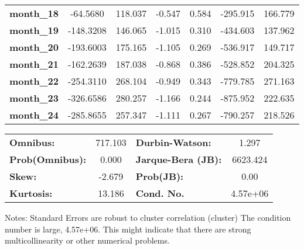 \begin{center}
\begin{tabular}{lcccccc}
\textbf{month\_18}    &     -64.5680  &      118.037     &    -0.547  &         0.584        &     -295.915    &      166.779     \\
\textbf{month\_19}    &    -148.3208  &      146.065     &    -1.015  &         0.310        &     -434.603    &      137.962     \\
\textbf{month\_20}    &    -193.6003  &      175.165     &    -1.105  &         0.269        &     -536.917    &      149.717     \\
\textbf{month\_21}    &    -162.2639  &      187.038     &    -0.868  &         0.386        &     -528.852    &      204.325     \\
\textbf{month\_22}    &    -254.3110  &      268.104     &    -0.949  &         0.343        &     -779.785    &      271.163     \\
\textbf{month\_23}    &    -326.6586  &      280.257     &    -1.166  &         0.244        &     -875.952    &      222.635     \\
\textbf{month\_24}    &    -285.8655  &      257.347     &    -1.111  &         0.267        &     -790.257    &      218.526     \\
\bottomrule
\end{tabular}
\begin{tabular}{lclc}
\textbf{Omnibus:}       & 717.103 & \textbf{  Durbin-Watson:     } &    1.297  \\
\textbf{Prob(Omnibus):} &   0.000 & \textbf{  Jarque-Bera (JB):  } & 6623.424  \\
\textbf{Skew:}          &  -2.679 & \textbf{  Prob(JB):          } &     0.00  \\
\textbf{Kurtosis:}      &  13.186 & \textbf{  Cond. No.          } & 4.57e+06  \\
\bottomrule
\end{tabular}
\end{center}

Notes: \newline
 [1] Standard Errors are robust to cluster correlation (cluster) \newline
 [2] The condition number is large, 4.57e+06. This might indicate that there are \newline
 strong multicollinearity or other numerical problems.